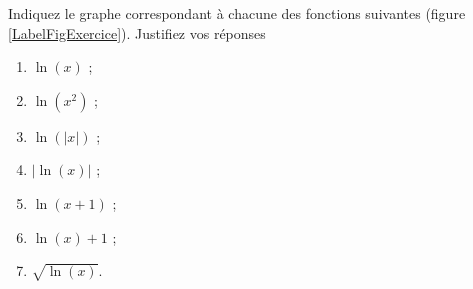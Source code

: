 
\begin{exercice}\label{exoDS2010-1-0002}

	Indiquez le graphe correspondant à chacune des fonctions suivantes (figure \ref{LabelFigExercice}). Justifiez vos réponses
\begin{multicols}{3}
  \begin{enumerate}
  \item $\ln(x)$ ;
  \item $\ln(x^2)$ ;
  \item $\ln(|x|)$ ;
  \item $|\ln(x)|$ ;
  \item $\ln(x+1)$ ;
  \item $\ln(x)+1$ ;
  \item $\sqrt{\ln(x)}$.
  \end{enumerate}
\end{multicols}

\newcommand{\CaptionFigExercice}{Les graphes à considérer de la question \ref{exoDS2010-1-0002}.}


\end{exercice}
